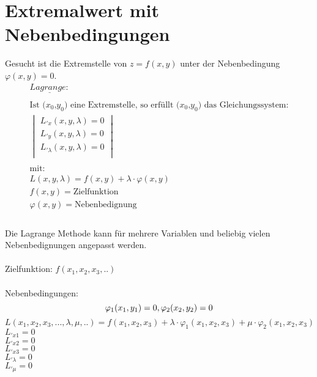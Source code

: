 \section{Extremalwert mit Nebenbedingungen}
Gesucht ist die Extremstelle von $z=f(x,y)$ unter der Nebenbedingung $\varphi(x,y)=0$.\\
\[
\boxed{\begin{array}{l}
	\underline{Lagrange:}\\
	\\
	\text{Ist ($x_0$,$y_0$) eine Extremstelle, so erfüllt ($x_0$,$y_0$) das Gleichungssystem:}\\
		\begin{vmatrix}
			L_{'x}(x,y,\lambda)=0\\
			L_{'y}(x,y,\lambda)=0\\
			L_{'\lambda}(x,y,\lambda)=0\\
		\end{vmatrix}\\
		\\
		\text{mit:}\\
		L(x,y,\lambda)=f(x,y)+\lambda\cdot\varphi(x,y)\\
		f(x,y) = \text{Zielfunktion}\\
		\varphi(x,y) = \text{Nebenbedignung}\\
\end{array}}\]
\\
Die Lagrange Methode kann für mehrere Variablen und beliebig vielen Nebenbedignungen angepasst werden.\\
\\
Zielfunktion: $f(x_1,x_2,x_3,..)$\\
\\
Nebenbedingungen: 
\[
	\varphi_1(x_1,y_1)=0, \\  \varphi_2(x_2,y_2)=0
\]
\[
	L(x_1,x_2,x_3,...,\lambda,\mu,..)=f(x_1,x_2,x_3)+\lambda\cdot\varphi_1(x_1,x_2,x_3)+\mu\cdot\varphi_2(x_1,x_2,x_3)
\]
$L_{'x1}=0$\\	$L_{'x2}=0$\\
$L_{'x3}=0$ \\     $L_{'\lambda}=0$\\
$L_{'\mu}= 0$
